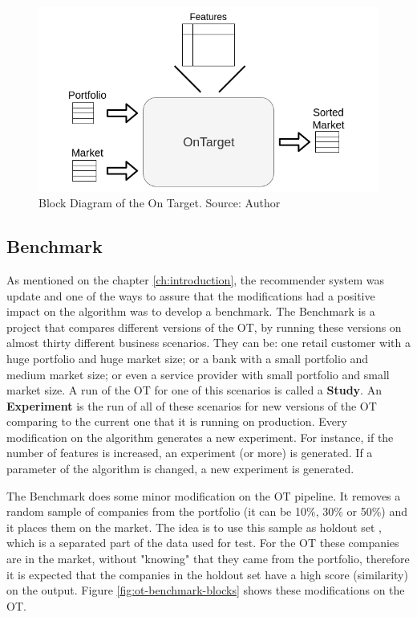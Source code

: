 \begin{figure}[h]
   \centering
   \includegraphics[width=\linewidth]{fig/ch3-ot-blocks.png}
   \caption{Block Diagram of the On Target. Source: Author}
   \label{fig:ot-blocks}
\end{figure}

\subsection{Benchmark}

As mentioned on the chapter \ref{ch:introduction}, the recommender system was update and one of the ways to assure that the modifications had a positive impact on the algorithm was to develop a benchmark. The Benchmark is a project that compares different versions of the OT, by running these versions on almost thirty different business scenarios. They can be: one retail customer with a huge portfolio and huge market size; or a bank with a small portfolio and medium market size; or even a service provider with small portfolio and small market size. A run of the OT for one of this scenarios is called a \textbf{Study}. An \textbf{Experiment} is the run of all of these scenarios for new versions of the OT comparing to the current one that it is running on production. Every modification on the algorithm generates a new experiment. For instance, if the number of features is increased, an experiment (or more) is generated. If a parameter of the algorithm is changed, a new experiment is generated.

The Benchmark does some minor modification on the OT pipeline. It removes a random sample of companies from the portfolio (it can be 10\%, 30\% or 50\%) and it places them on the market. The idea is to use this sample as holdout set \cite{kohavi2001}, which is a separated part of the data used for test. For the OT these companies are in the market, without "knowing" that they came from the portfolio, therefore it is expected that the companies in the holdout set have a high score (similarity) on the output. Figure \ref{fig:ot-benchmark-blocks} shows these modifications on the OT.

